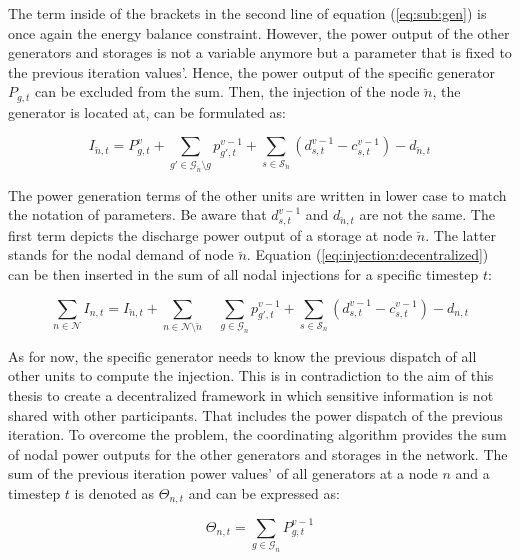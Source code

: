 The term inside of the brackets in the second line of equation (\ref{eq:sub:gen}) is once again the energy balance constraint. However, the power output of the other generators and storages is not a variable anymore but a parameter that is fixed to the previous iteration values'. Hence, the power output of the specific generator $P_{g,t}$ can be excluded from the sum. Then, the injection of the node $\breve{n}$, the generator is located at, can be formulated as:
 
 \begin{equation}
	I_{\breve{n},t} = P_{g,t}^v + \sum_{g'\in\mathcal{G}_{\breve{n}} \setminus g}p_{g',t}^{v-1} + \sum_{s\in\mathcal{S}_{\breve{n}}}(d_{s,t}^{v-1}-c_{s,t}^{v-1})-d_{\breve{n},t}
	\label{eq:injection:decentralized}
\end{equation} 
 
 The power generation terms of the other units are written in lower case to match the notation of parameters. Be aware that $d_{s,t}^{v-1}$ and $d_{\breve{n},t}$ are not the same. The first term depicts the discharge power output of a storage at node $\breve{n}$. The latter stands for the nodal demand of node $\breve{n}$. Equation (\ref{eq:injection:decentralized}) can be then inserted in the sum of all nodal injections for a specific timestep $t$:
 
 \begin{equation}
 	\sum_{n \in \mathcal{N}} I_{n,t} = I_{\breve{n},t} + \sum_{n \in \mathcal{N} \setminus \breve{n}} \quad \sum_{g\in\mathcal{G}_n}p_{g',t}^{v-1} + \sum_{s\in\mathcal{S}_n}(d_{s,t}^{v-1}-c_{s,t}^{v-1})-d_{n,t}
 \end{equation}
 
 As for now, the specific generator needs to know the previous dispatch of all other units to compute the injection. This is in contradiction to the aim of this thesis to create a decentralized framework in which sensitive information is not shared with other participants. That includes the power dispatch of the previous iteration. To overcome the problem, the coordinating algorithm provides the sum of nodal power outputs for the other generators and storages in the network. The sum of the previous iteration power values' of all generators at a node $n$ and a timestep $t$ is denoted as $\Theta_{n,t}$ and can be expressed as:
 
 \begin{equation}
 	\Theta_{n,t} = \sum_{g\in\mathcal{G}_{n}}P_{g,t}^{v-1}
 \end{equation}
 
